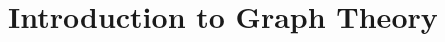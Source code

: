 \documentclass[12pt, oneside]{book}
\begin{document}
%



%


%
%
%
%
\setcounter{chapter}{1}
\chapter[Graph Theory]{Introduction to Graph Theory}




%
%
%
%
%
%
%
%
%
%
%
%
%

%
%
%
%

%
%
%
%
%
%
\end{document}
